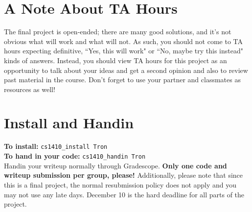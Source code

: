 \documentclass{article}
\begin{document}
\section{A Note About TA Hours}

The final project is open-ended; there are many good solutions, and it's not obvious what will work and what will not.
As such, you should not come to TA hours expecting definitive, ``Yes, this will work" or ``No, maybe try this instead" kinds of answers.
Instead, you should view TA hours for this project as an opportunity to talk about your ideas and get a second opinion and also to review past material in the course.
Don't forget to use your partner and classmates as resources as well!

\section{Install and Handin}

\textbf{To install:} \verb|cs1410_install Tron| ~\\

\textbf{To hand in your code:} \verb|cs1410_handin Tron| ~\\

Handin your writeup normally through Gradescope.
\textbf{Only one code and writeup submission per group, please!}
Additionally, please note that since this is a final project, the normal resubmission policy does not apply and you may not use any late days.
December 10 is the hard deadline for all parts of the project.
\end{document}
